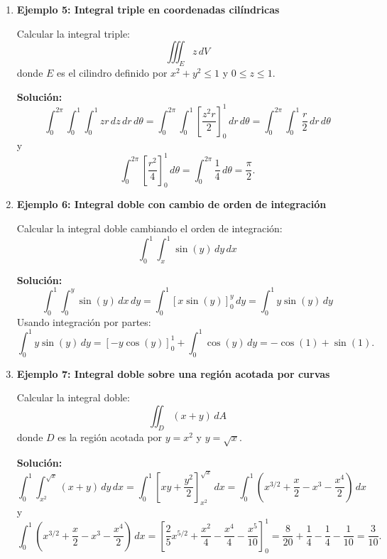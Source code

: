 \documentclass[11pt]{book}
\theoremstyle{definicion}
\theoremstyle{teorema}
\theoremstyle{ejemplo}
\begin{document}
\begin{enumerate}
\item \textbf{Ejemplo 5: Integral triple en coordenadas cilíndricas}

Calcular la integral triple:
\[
\iiint_E z \, dV
\]
donde \( E \) es el cilindro definido por \( x^2 + y^2 \leq 1 \) y \( 0 \leq z \leq 1 \).

\textbf{Solución:}
\[
\int_{0}^{2\pi} \int_{0}^{1} \int_{0}^{1} z r \, dz \, dr \, d\theta = \int_{0}^{2\pi} \int_{0}^{1} \left[ \frac{z^2 r}{2} \right]_{0}^{1} \, dr \, d\theta = \int_{0}^{2\pi} \int_{0}^{1} \frac{r}{2} \, dr \, d\theta %
\]
y
\[
\int_{0}^{2\pi} \left[ \frac{r^2}{4} \right]_{0}^{1} \, d\theta = \int_{0}^{2\pi} \frac{1}{4} \, d\theta = \frac{\pi}{2}.
\]
\item \textbf{Ejemplo 6: Integral doble con cambio de orden de integración}

Calcular la integral doble cambiando el orden de integración:
\[
\int_{0}^{1} \int_{x}^{1} \sin(y) \, dy \, dx
\]

\textbf{Solución:}
\[
\int_{0}^{1} \int_{0}^{y} \sin(y) \, dx \, dy = \int_{0}^{1} \left[ x \sin(y) \right]_{0}^{y} \, dy = \int_{0}^{1} y \sin(y) \, dy
\]
Usando integración por partes:
\[
\int_{0}^{1} y \sin(y) \, dy = \left[ -y \cos(y) \right]_{0}^{1} + \int_{0}^{1} \cos(y) \, dy = -\cos(1) + \sin(1).
\]

\item \textbf{Ejemplo 7: Integral doble sobre una región acotada por curvas}

Calcular la integral doble:
\[
\iint_D (x + y) \, dA
\]
donde \( D \) es la región acotada por \( y = x^2 \) y \( y = \sqrt{x} \).

\textbf{Solución:}
\[
\int_{0}^{1} \int_{x^2}^{\sqrt{x}} (x + y) \, dy \, dx = \int_{0}^{1} \left[ xy + \frac{y^2}{2} \right]_{x^2}^{\sqrt{x}} \, dx = \int_{0}^{1} \left( x^{3/2} + \frac{x}{2} - x^3 - \frac{x^4}{2} \right) \, dx %
\]
y
\[
\int_{0}^{1} \left( x^{3/2} + \frac{x}{2} - x^3 - \frac{x^4}{2} \right) \, dx = 
\left[ \frac{2}{5}x^{5/2} + \frac{x^2}{4} - \frac{x^4}{4} - \frac{x^5}{10} \right]_{0}^{1} = \frac{8}{20} + \frac{1}{4} - \frac{1}{4} - \frac{1}{10} = \frac{3}{10}.
\]


\end{enumerate}
\end{document}
